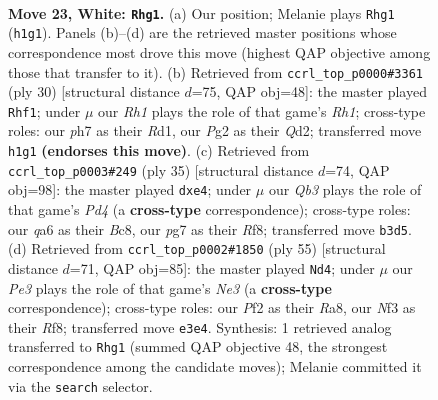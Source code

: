 \documentclass[11pt]{article}
\begin{document}
\clearpage

\begin{figure}[p]\centering
\begin{subfigure}{0.46\textwidth}\centering
\resizebox{\linewidth}{!}{%
\newchessgame
\chessboard[
  setfen={rk3b1r/pp4pp/q1p1b3/3p1p2/P2P3P/1Q2PN2/1PKB1PP1/1R5R w - - 3 23},
  showmover=false,
  pgfstyle=straightmove, color=movearrow, markmove={h1-g1}
]}
\caption{}
\end{subfigure}\hfill
\begin{subfigure}{0.46\textwidth}\centering
\resizebox{\linewidth}{!}{%
\newchessgame
\chessboard[
  setfen={r1b2rk1/pp4p1/1qp4p/2bp1p2/7P/2PB1N2/PPPQ1PP1/1K1R3R w - - 2 16},
  showmover=false,
  pgfstyle=straightmove, color=movearrow, markmove={h1-f1}
]}
\caption{}
\end{subfigure}
\\[4pt]
\begin{subfigure}{0.46\textwidth}\centering
\resizebox{\linewidth}{!}{%
\newchessgame
\chessboard[
  setfen={2b2rk1/rpp1nppp/6q1/p2p4/4P3/2PB1P2/PPQN2PP/R5RK b - - 0 18},
  showmover=false,
  pgfstyle=straightmove, color=movearrow, markmove={d5-e4}
]}
\caption{}
\end{subfigure}\hfill
\begin{subfigure}{0.46\textwidth}\centering
\resizebox{\linewidth}{!}{%
\newchessgame
\chessboard[
  setfen={r4r2/1p4pk/3pn1qp/p1p1p3/2P1P3/1Q3P2/PP1R2PP/4R1BK b - - 3 28},
  showmover=false,
  pgfstyle=straightmove, color=movearrow, markmove={e6-d4}
]}
\caption{}
\end{subfigure}
\caption{\textbf{Move 23, White: \texttt{Rhg1}.} (a) Our position; Melanie plays \texttt{Rhg1} (\texttt{h1g1}). Panels (b)--(d) are the retrieved master positions whose correspondence most drove this move (highest QAP objective among those that transfer to it). (b) Retrieved from \texttt{ccrl\_top\_p0000\#3361} (ply 30) [structural distance $d$=75, QAP obj=48]: the master played \texttt{Rhf1}; under $\mu$ our \emph{Rh1} plays the role of that game's \emph{Rh1}; cross-type roles: our \emph{p}h7 as their \emph{R}d1, our \emph{P}g2 as their \emph{Q}d2; transferred move \texttt{h1g1} \textbf{(endorses this move)}. (c) Retrieved from \texttt{ccrl\_top\_p0003\#249} (ply 35) [structural distance $d$=74, QAP obj=98]: the master played \texttt{dxe4}; under $\mu$ our \emph{Qb3} plays the role of that game's \emph{Pd4} (a \textbf{cross-type} correspondence); cross-type roles: our \emph{q}a6 as their \emph{B}c8, our \emph{p}g7 as their \emph{R}f8; transferred move \texttt{b3d5}. (d) Retrieved from \texttt{ccrl\_top\_p0002\#1850} (ply 55) [structural distance $d$=71, QAP obj=85]: the master played \texttt{Nd4}; under $\mu$ our \emph{Pe3} plays the role of that game's \emph{Ne3} (a \textbf{cross-type} correspondence); cross-type roles: our \emph{P}f2 as their \emph{R}a8, our \emph{N}f3 as their \emph{R}f8; transferred move \texttt{e3e4}. Synthesis: 1 retrieved analog transferred to \texttt{Rhg1} (summed QAP objective 48, the strongest correspondence among the candidate moves); Melanie committed it via the \texttt{search} selector.}
\label{fig:thought-m44}
\end{figure}
\end{document}
